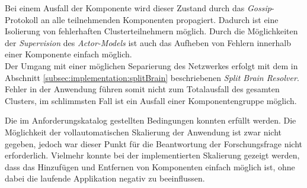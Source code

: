 \begin{enumerate}
  Bei einem Ausfall der Komponente wird dieser Zustand durch das \textit{Gossip}-Protokoll an alle teilnehmenden Komponenten propagiert. Dadurch ist eine Isolierung von fehlerhaften Clusterteilnehmern möglich. Durch die Möglichkeiten der \textit{Supervision} des \textit{Actor-Models} ist auch das Aufheben von Fehlern innerhalb einer Komponente einfach möglich. \\
  Der Umgang mit einer möglichen Separierung des Netzwerkes erfolgt mit dem in Abschnitt \ref{subsec:implementation:splitBrain} beschriebenen \textit{Split Brain Resolver}. Fehler in der Anwendung führen somit nicht zum Totalausfall des gesamten Clusters, im schlimmsten Fall ist ein Ausfall einer Komponentengruppe möglich.
\end{enumerate}
Die im Anforderungskatalog gestellten Bedingungen konnten erfüllt werden. Die Möglichkeit der vollautomatischen Skalierung der Anwendung ist zwar nicht gegeben, jedoch war dieser Punkt für die Beantwortung der Forschungsfrage nicht erforderlich. Vielmehr konnte bei der implementierten Skalierung gezeigt werden, dass das Hinzufügen und Entfernen von Komponenten einfach möglich ist, ohne dabei die laufende Applikation negativ zu beeinflussen. 

